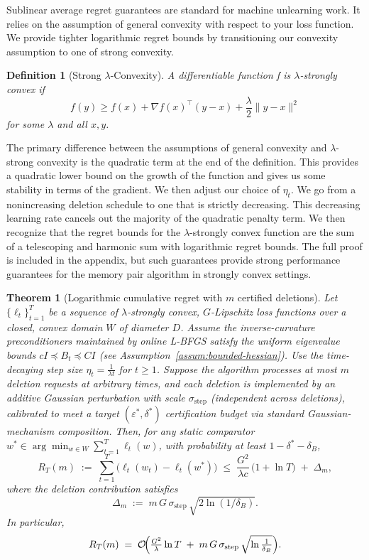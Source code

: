 \documentclass{article}
\theoremstyle{ssltheorem}
\newtheorem{theorem}{Theorem}
\newtheorem{definition}{Definition}
\begin{document}
Sublinear average regret guarantees are standard for machine unlearning work.
It relies on the assumption of general convexity with respect to your loss function.
We provide tighter logarithmic regret bounds by transitioning our convexity assumption to one of strong convexity.
\begin{definition}[Strong $\lambda$-Convexity]
    A differentiable function f is $\lambda$-strongly convex if 
    $$
    f(y) \geq f(x) + \nabla f(x)^{\top}(y-x)+ \frac{\lambda}{2}\|y-x\|^{2}
    $$
    for some $\lambda$ and all $x,y$.
\end{definition}

The primary difference between the assumptions of general convexity and $\lambda$-strong convexity is the quadratic term at the end of the definition.
This provides a quadratic lower bound on the growth of the function and gives us some stability in terms of the gradient.
We then adjust our choice of $\eta_{t}$. We go from a nonincreasing deletion schedule to one that is strictly decreasing.
This decreasing learning rate cancels out the majority of the quadratic penalty term.
We then recognize that the regret bounds for the $\lambda$-strongly convex function are the sum of a telescoping and harmonic sum with logarithmic regret bounds.
The full proof is included in the appendix, but such guarantees provide strong performance guarantees for the memory pair algorithm in strongly convex settings.
\begin{theorem}[Logarithmic cumulative regret with $m$ certified deletions]
\label{thm:log_regret}
Let $\{\ell_{t}\}_{t=1}^T$ be a sequence of $\lambda$-strongly convex, $G$-Lipschitz loss functions over a closed, convex domain $W$ of diameter $D$.
Assume the inverse-curvature preconditioners maintained by online \mbox{L-BFGS} satisfy the uniform eigenvalue bounds $cI \preceq B_{t} \preceq CI$ (see Assumption~\ref{assum:bounded-hessian}).
Use the time-decaying step size $\eta_{t}=\frac{1}{\lambda t}$ for $t\ge 1$.
Suppose the algorithm processes at most $m$ deletion requests at arbitrary times, and each deletion is implemented by an additive Gaussian perturbation with scale $\sigma_{\text{step}}$ (independent across deletions), calibrated to meet a target $(\varepsilon^{*},\delta^{*})$ certification budget via standard Gaussian-mechanism composition.
Then, for any static comparator $w^{*}\in\arg\min_{w\in W}\sum_{t=1}^T \ell_{t}(w)$, with probability at least $1-\delta^{*}-\delta_{B}$,
\[
R_{T}(m)\;:=\;\sum_{t=1}^{T}\bigl(\ell_{t}(w_{t})-\ell_{t}(w^{*})\bigr)
\;\le\;
\frac{G^{2}}{\lambda c}\,\bigl(1+\ln T\bigr)\;+\;\Delta_{m},
\]
where the deletion contribution satisfies
\[
\Delta_{m} \;:=\; m\,G\,\sigma_{\text{step}}\,\sqrt{2\ln(1/\delta_{B})}.
\]
In particular,
\[
R_{T}(m)\;=\;\mathcal{O}\!\Bigl(\tfrac{G^{2}}{\lambda}\ln T\;+\;m\,G\,\sigma_{\text{step}}\,\sqrt{\ln\tfrac{1}{\delta_{B}}}\Bigr).
\]
\end{theorem}
\end{document}

